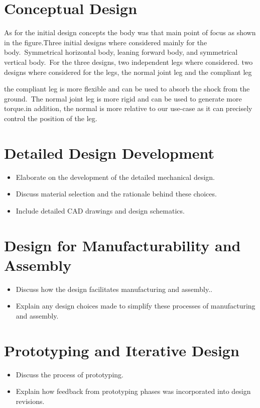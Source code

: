 \section{Conceptual Design}

As for the initial design concepts the body was that main point of focus as shown in the figure.Three initial designs where considered mainly for the body.\ Symmetrical horizontal body, leaning forward body, and symmetrical vertical body.\ For the three designs, two independent legs where considered.
two designs where considered for the legs, the normal joint leg and the compliant leg

the compliant leg is more flexible and can be used to absorb the shock from the ground.\ The normal joint leg is more rigid and can be used to generate more torque.in addition, the normal is more relative to our use-case as it can precisely control the position of the leg.


\section{Detailed Design Development}
\begin{itemize}
	\item Elaborate on the development of the detailed mechanical design.
	\item Discuss material selection and the rationale behind these choices.
	\item Include detailed CAD drawings and design schematics.
\end{itemize}
\section{Design for Manufacturability and Assembly}
\begin{itemize}
	\item Discuss how the design facilitates manufacturing and assembly..
	\item Explain any design choices made to simplify these processes of manufacturing and assembly.
\end{itemize}
\section{Prototyping and Iterative Design}
\begin{itemize}
	\item Discuss the process of prototyping.
	\item Explain how feedback from prototyping phases was incorporated into design revisions.
\end{itemize}

